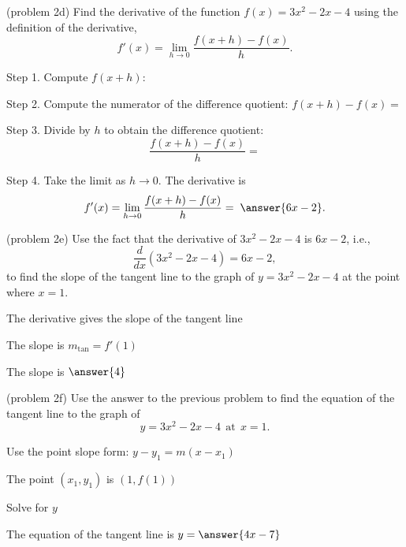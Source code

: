\documentclass[handout]{ximera}
\begin{document}
\begin{problem}(problem 2d)
Find the derivative of the function $f(x) = 3x^2 - 2x -4$ using the definition of the derivative,
\[
f'(x) = \lim_{h \to 0} \frac{f(x+h) - f(x)}{h}.
\]

Step 1. Compute $f(x + h)$:
\begin{multipleChoice}
\end{multipleChoice}


Step 2. Compute the numerator of the difference quotient: $f(x+h) - f(x) =$
\begin{multipleChoice}
\end{multipleChoice}


Step 3. Divide by $h$ to obtain the difference quotient:
\[
\frac{f(x+h) - f(x)}{h} = 
\]
\begin{multipleChoice}
\end{multipleChoice}

Step 4. Take the limit as $h \to 0$. The derivative is
\[
f'(x) = \lim_{h \to 0} \frac{f(x+h) - f(x)}{h} = \; \answer{6x-2}.
\]
\end{problem} 


\begin{problem}(problem 2e)
Use the fact that the derivative of $3x^2 -2x - 4$ is $6x-2$,
i.e., 
\[
\frac{d}{dx}\left( 3x^2 - 2x -4  \right) = 6x-2,
\]
to find the slope of the tangent line to the graph of 
$y = 3x^2 - 2x - 4$ at the point where $x = 1$.\\
\begin{hint}
The derivative gives the slope of the tangent line
\end{hint}
\begin{hint}
The slope is $m_{\text{tan}} = f'(1)$
\end{hint}
The slope is $\answer{4}$
\end{problem}

\begin{problem}(problem 2f)
Use the answer to the previous problem to find the equation of the tangent line to the graph of 
\[
y = 3x^2 - 2x - 4 \ \ \text{at} \ \ x=1.
\]
\begin{hint}
Use the point slope form: $y-y_1 = m(x-x_1)$
\end{hint}
\begin{hint}
The point $(x_1,y_1)$ is $(1, f(1))$
\end{hint}
\begin{hint}
Solve for $y$
\end{hint}
The equation of the tangent line is \; $y = \answer{4x - 7}$
\end{problem}
\end{document}
